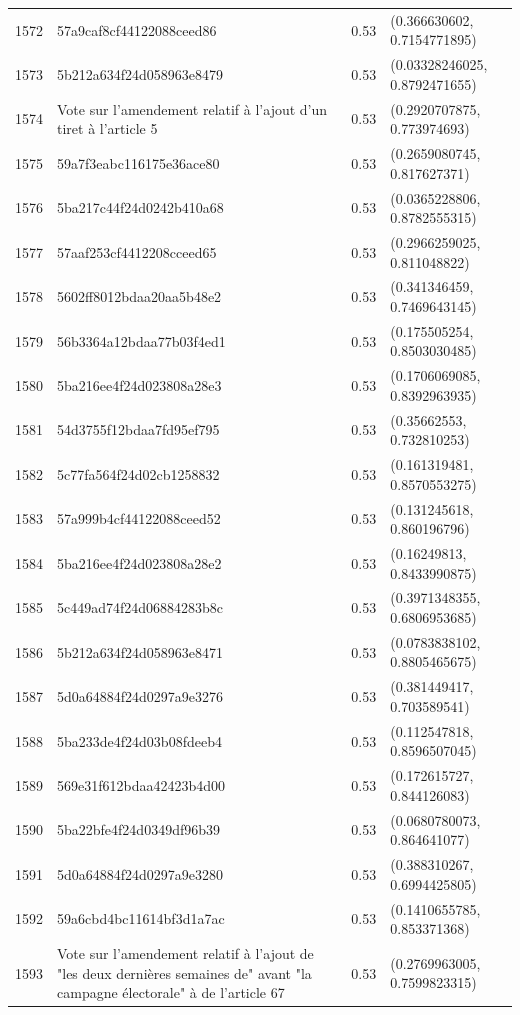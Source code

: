 \begin{table}[ht]
\begin{tabular}{rlrl}
  1572 & 57a9caf8cf44122088ceed86 & 0.53 & (0.366630602, 0.7154771895) \\ 
  1573 & 5b212a634f24d058963e8479 & 0.53 & (0.03328246025, 0.8792471655) \\ 
  1574 & Vote sur l'amendement relatif à l'ajout d'un tiret à l'article 5 & 0.53 & (0.2920707875, 0.773974693) \\ 
  1575 & 59a7f3eabc116175e36ace80 & 0.53 & (0.2659080745, 0.817627371) \\ 
  1576 & 5ba217c44f24d0242b410a68 & 0.53 & (0.0365228806, 0.8782555315) \\ 
  1577 & 57aaf253cf4412208cceed65 & 0.53 & (0.2966259025, 0.811048822) \\ 
  1578 & 5602ff8012bdaa20aa5b48e2 & 0.53 & (0.341346459, 0.7469643145) \\ 
  1579 & 56b3364a12bdaa77b03f4ed1 & 0.53 & (0.175505254, 0.8503030485) \\ 
  1580 & 5ba216ee4f24d023808a28e3 & 0.53 & (0.1706069085, 0.8392963935) \\ 
  1581 & 54d3755f12bdaa7fd95ef795 & 0.53 & (0.35662553, 0.732810253) \\ 
  1582 & 5c77fa564f24d02cb1258832 & 0.53 & (0.161319481, 0.8570553275) \\ 
  1583 & 57a999b4cf44122088ceed52 & 0.53 & (0.131245618, 0.860196796) \\ 
  1584 & 5ba216ee4f24d023808a28e2 & 0.53 & (0.16249813, 0.8433990875) \\ 
  1585 & 5c449ad74f24d06884283b8c & 0.53 & (0.3971348355, 0.6806953685) \\ 
  1586 & 5b212a634f24d058963e8471 & 0.53 & (0.0783838102, 0.8805465675) \\ 
  1587 & 5d0a64884f24d0297a9e3276 & 0.53 & (0.381449417, 0.703589541) \\ 
  1588 & 5ba233de4f24d03b08fdeeb4 & 0.53 & (0.112547818, 0.8596507045) \\ 
  1589 & 569e31f612bdaa42423b4d00 & 0.53 & (0.172615727, 0.844126083) \\ 
  1590 & 5ba22bfe4f24d0349df96b39 & 0.53 & (0.0680780073, 0.864641077) \\ 
  1591 & 5d0a64884f24d0297a9e3280 & 0.53 & (0.388310267, 0.6994425805) \\ 
  1592 & 59a6cbd4bc11614bf3d1a7ac & 0.53 & (0.1410655785, 0.853371368) \\ 
  1593 & Vote sur l'amendement relatif à l'ajout de "les deux dernières semaines de" avant "la campagne électorale" à de l'article 67 & 0.53 & (0.2769963005, 0.7599823315) \\ 

\end{tabular}
\end{table}
